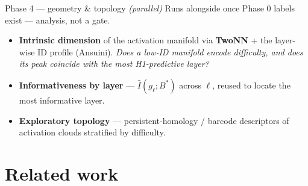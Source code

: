 \documentclass[aspectratio=169,12pt,t,compress]{beamer}
\begin{document}
\begin{frame}{Phase 4 --- geometry \& topology \emph{(parallel)}}
	Runs alongside once Phase 0 labels exist --- analysis, not a gate.

	\vspace{0.5em}
	\begin{itemize}\small
		\item \textbf{Intrinsic dimension} of the activation manifold via
		      \textbf{TwoNN} + the layer-wise ID profile (Ansuini).
		      \emph{Does a low-ID manifold encode difficulty, and does its peak
		      coincide with the most H1-predictive layer?}
		\item \textbf{Informativeness by layer} --- $\hat{I}(g_\ell; B^*)$ across
		      $\ell$, reused to locate the most informative layer.
		\item \textbf{Exploratory topology} --- persistent-homology / barcode
		      descriptors of activation clouds stratified by difficulty.
	\end{itemize}
\end{frame}

\section{Related work}
\end{document}
